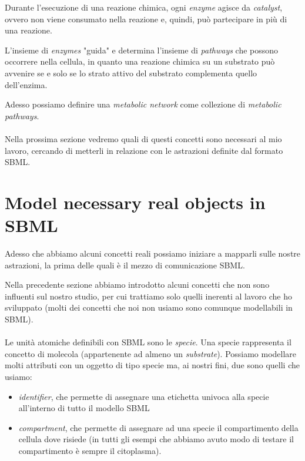 Durante l'esecuzione di una reazione chimica, ogni \emph{enzyme}
agisce da \emph{catalyst}, ovvero non viene consumato nella reazione
e, quindi, pu\`o partecipare in pi\`u di una reazione.

L'insieme di \emph{enzymes} "guida" e determina l'insieme di
\emph{pathways} che possono occorrere nella cellula, in quanto una
reazione chimica su un substrato pu\`o avvenire se e solo se lo strato
attivo del substrato complementa quello dell'enzima.

Adesso possiamo definire una \emph{metabolic network} come collezione
di \emph{metabolic pathways}.
\\\\
Nella prossima sezione vedremo quali di questi concetti sono necessari
al mio lavoro, cercando di metterli in relazione con le astrazioni
definite dal formato SBML.

\section{Model necessary real objects in SBML}

Adesso che abbiamo alcuni concetti reali possiamo iniziare a mapparli
sulle nostre astrazioni, la prima delle quali \`e il mezzo di
comunicazione SBML.

Nella precedente sezione abbiamo introdotto alcuni concetti che non
sono influenti sul nostro studio, per cui trattiamo solo quelli
inerenti al lavoro che ho sviluppato (molti dei concetti che noi non
usiamo sono comunque modellabili in SBML).
\\\\
Le unit\`a atomiche definibili con SBML sono le \emph{specie}. Una
specie rappresenta il concetto di molecola (appartenente ad almeno un
\emph{substrate}). Possiamo modellare molti attributi con un oggetto
di tipo specie ma, ai nostri fini, due sono quelli che usiamo:
\begin{itemize}
\item \emph{identifier}, che permette di assegnare una etichetta univoca
alla specie all'interno di tutto il modello SBML
\item \emph{compartment}, che permette di assegnare ad una specie il
compartimento della cellula dove risiede (in tutti gli esempi che
abbiamo avuto modo di testare il compartimento \`e sempre il
citoplasma).
\end{itemize}

